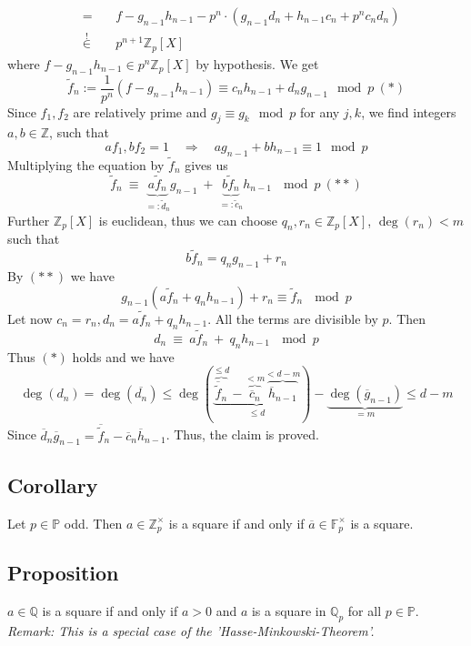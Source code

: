 \documentclass[12pt]{book}
\begin{document}
\begin{spacing}{1.3}
\begin{compactenum}
\begin{alignat*}{5}
&=&& \ f- g_{n-1}h_{n-1} - p^n \cdot \left( g_{n-1}d_n+h_{n-1}c_n + p^n c_n d_n \right)\\
&\overset{!}{\in}&& \ p^{n+1} \mathbb{Z}_p[X]
\end{alignat*}
where $f-g_{n-1}h_{n-1} \in p^n \mathbb{Z}_p[X]$ by hypothesis. We get 
$$\tilde{f}_n := \frac{1}{p^n} (f-g_{n-1}h_{n-1}) \equiv c_n h_{n-1} + d_n g_{n-1} \mod p \ (*)$$
Since $f_1, f_2$ are relatively prime and $g_j \equiv g_k \mod p$ for any $j,k$, we find integers $a,b \in \mathbb{Z}$, such that
$$af_1, bf_2=1 \quad \Longrightarrow \quad ag_{n-1}+bh_{n-1} \equiv 1 \mod p$$
Multiplying the equation by $\tilde{f}_n$ gives us 
$$\tilde{f}_n \ \equiv \ \underbrace{a \tilde{f}_n}_{=:\tilde{d}_n} g_{n-1} \ + \ \underbrace{b \tilde{f}_{n}}_{=:\tilde{c}_n} h_{n-1} \ \mod p \ (**)$$
Further $\mathbb{Z}_p[X]$ is euclidean, thus we can choose $q_n, r_n \in \mathbb{Z}_p[X]$, $\deg(r_n)<m$ such that
$$b \tilde{f}_n=q_n g_{n-1} + r_n$$
By $(**)$ we have
$$g_{n-1}\left(a \tilde{f}_n + q_n h_{n-1}\right) + r_n \equiv \tilde{f}_n \ \mod p$$
Let now $c_n=r_n, d_n=a\tilde{f}_n+q_nh_{n-1}$. All the terms are divisible by $p$. Then
$$d_n \ \equiv\ a \tilde{f}_n \ + \ q_nh_{n-1} \ \mod p$$
Thus $(*)$ holds and we have
$$\deg(d_n)=\deg(\overline{d_n})\leqslant \deg\left(\underbrace{\overbrace{\overline{\tilde{f}}_n}^{\leqslant d}-\overbrace{\overline{c}_n}^{<m}\overbrace{\overline{h}_{n-1}}^{<d-m}}_{\leqslant d}\right)-\underbrace{\deg(\overline{g}_{n-1})}_{=m} \leqslant d-m$$
Since $\overline{d}_n\overline{g}_{n-1}=\overline{\tilde{f}}_n-\overline{c}_n\overline{h}_{n-1}$. Thus, the claim is proved. 
\end{compactenum}

\subsection{Corollary}%
Let $p\in \mathbb{P}$ odd. Then
$a \in \mathbb{Z}_p^{\times}$ is a square if and only if $\overline{a} \in \mathbb{F}_p^{\times}$ is a square.

\subsection{Proposition}%
$a \in \mathbb{Q}$ is a square if and only if $a>0$ and $a$ is a square in $\mathbb{Q}_p$ for all $p \in \mathbb{P}$. 
\\
\textit{Remark: This is a special case of the 'Hasse-Minkowski-Theorem'. 
}




\end{spacing}
\end{document}
